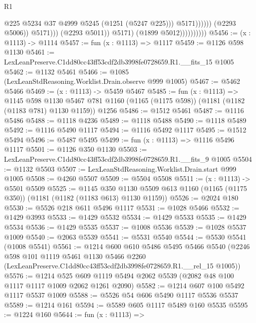 \begin{lexlean}{R1}
\begin{coremodule}
                                                @225
                                                @5234
                                                @37
                                                @4999
                                                @5245
                                                (@1251 (@5247 @225)))
                                              @5171))))))
                                  (@2293 @5006))
                                @5171)))
                          (@2293 @5011))
                        @5171)
                      (@1899 @5012))))))))))
@5456 := (x : @1113) -> @1114
@5457 := fun (x : @1113) => @1117
@5459 := @1126 @598 @1130
@5461 := LexLeanPreserve.C1dd80cc43ff53cdf2db3998fe0728659.R1.__fits_15 @1005
@5462 := @1132 @5461
@5466 := @1085 (LexLeanStdReasoning.Worklist.Drain.observe @999 @1005)
@5467 := @5462 @5466
@5469 := (x : @1113) -> @5459 @5467
@5485 := fun (x : @1113) =>
  @1145
    @598
    @1130
    @5467
    @781
    @1160
    (@1165 (@1175 @598))
    (@1181 (@1182 (@1183 @781) @1130 @1159))
    @1256
@5486 := @1512 @5461
@5487 := @1116 @5486
@5488 := @1118 @4236
@5489 := @1118 @5488
@5490 := @1118 @5489
@5492 := @1116 @5490 @1117
@5494 := @1116 @5492 @1117
@5495 := @1512 @5494
@5496 := @5487 @5495
@5499 := fun (x : @1113) => @1116 @5496 @1117
@5501 := @1126 @350 @1130
@5503 := LexLeanPreserve.C1dd80cc43ff53cdf2db3998fe0728659.R1.__fits_9 @1005
@5504 := @1132 @5503
@5507 := LexLeanStdReasoning.Worklist.Drain.start @999 @1005
@5508 := @4260 @5507
@5509 := @5504 @5508
@5511 := (x : @1113) -> @5501 @5509
@5525 := @1145
    @350
    @1130
    @5509
    @613
    @1160
    (@1165 (@1175 @350))
    (@1181 (@1182 (@1183 @613) @1130 @1159))
@5526 := @2024 @180
@5530 := @5526 @218 @611 @5496 @1117
@5531 := @1028 @5466
@5532 := @1429 @3993
@5533 := @1429 @5532
@5534 := @1429 @5533
@5535 := @1429 @5534
@5536 := @1429 @5535
@5537 := @1008 @5536
@5539 := @1028 @5537 @1009
@5540 := @2063 @5539
@5541 := @5531 @5540
@5544 := @5530 @5541 (@1008 @5541)
@5561 := @1214
    @600
    @610
    @5486
    @5495
    @5466
    @5540
    (@2246
      @598
      @101
      @1119
      @5461
      @1130
      @5466
      @2260
      (LexLeanPreserve.C1dd80cc43ff53cdf2db3998fe0728659.R1.__rel_15 @1005))
@5576 := @1214
    @525
    @609
    @1119
    @5494
    @2062
    @5539
    (@2082 @48 @100 @1117 @1117 @1009 @2062 @1261 @2090)
@5582 := @1214 @607 @100 @5492 @1117 @5537 @1009
@5588 := @5526 @54 @606 @5490 @1117 @5536 @5537
@5589 := @1214 @161
@5594 := @5589 @605 @1117 @5489 @160 @5535
@5595 := @1224 @160
@5644 := fun (x : @1113) =>

\end{coremodule}
\end{lexlean}
